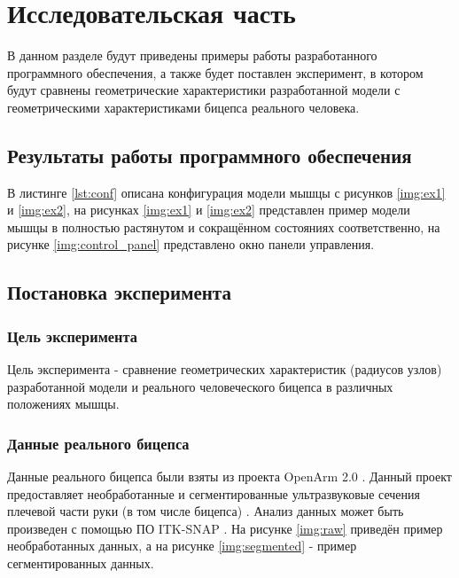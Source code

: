 \chapter{Исследовательская часть}

В данном разделе будут приведены примеры работы разработанного программного обеспечения, а также будет поставлен эксперимент, в котором будут сравнены геометрические характеристики разработанной модели с геометрическими характеристиками бицепса реального человека.

\section{Результаты работы программного обеспечения}

В листинге \ref{lst:conf} описана конфигурация модели мышцы с рисунков \ref{img:ex1} и \ref{img:ex2}, на рисунках \ref{img:ex1} и \ref{img:ex2} представлен пример модели мышцы в полностью растянутом и сокращённом состояниях соответственно, на рисунке \ref{img:control_panel} представлено окно панели управления.


\clearpage
{}
\clearpage
{}

\section{Постановка эксперимента}

\subsection{Цель эксперимента}

Цель эксперимента - сравнение геометрических характеристик (радиусов узлов) разработанной модели и реального человеческого бицепса в различных положениях мышцы.

\subsection{Данные реального бицепса}

Данные реального бицепса были взяты из проекта OpenArm 2.0 \cite{openarm}. Данный проект предоставляет необработанные и сегментированные ультразвуковые сечения плечевой части руки (в том числе бицепса) \cite{openarm1}. Анализ данных может быть произведен с помощью ПО ITK-SNAP \cite{itk}. На рисунке \ref{img:raw} приведён пример необработанных данных, а на рисунке \ref{img:segmented} - пример сегментированных данных.

